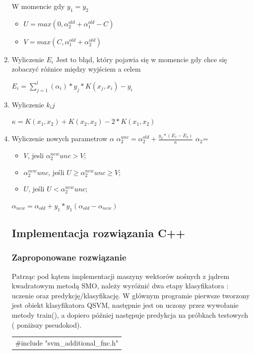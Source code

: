 \documentclass[[10pt,a4paper]{article}
\begin{document}
\begin{enumerate}
 
W momencie gdy $y_{1}=y_{2}$
\begin{itemize}
\item$ U = max(0,\alpha_{2}^{old} + \alpha_{1}^{old} - C)$
 \item $ V = max(C, \alpha_{1}^{old} + \alpha_{2}^{old})$
 
\end{itemize}
\item Wyliczenie $E_i$ Jest to błąd, który pojawia się w momencie gdy chce się zobaczyć różnice między wyjściem a celem

$ E_i = \sum_{j=1}^{l}(\alpha_{i})*y_{j}*K(x_j,x_i)-y_i$

\item Wyliczenie $k_ij$

$\kappa = K(x_1,x_2) + K(x_2,x_2) - 2*K(x_1,x_2)$

\item Wyliczenie nowych parametrow $\alpha$ \newline
$\alpha_{2}^{unc} = \alpha_{2}^{old} + \frac{y_2*(E_1-E_2)}{\kappa}$
\newline
$\alpha_{2}$= 
\begin{itemize}
\item $V$, jesli $\alpha_{2}^{new}{unc}>V$;
\item $\alpha_{2}^{new}{unc}$, jeśli $U\ge\alpha_{2}^{new}{unc}\ge V$;
\item $U$, jeśli $U<\alpha_{2}^{new}{unc}$;
\newline
\end{itemize}
$\alpha_{new} = \alpha_{old} + y_{1}*y_{1}(\alpha_{old}-\alpha_{new})$
\newpage
\subsection{Implementacja rozwiązania C++}
\subsubsection{Zaproponowane rozwiązanie}
Patrząc pod kątem implementacji maszyny wektorów nośnych z jądrem kwadratowym metodą SMO, należy wyróżnić dwa etapy klasyfikatora : uczenie oraz predykcję/klasyfikację. W głównym programie pierwsze tworzony jest obiekt klasyfikatora QSVM, następnie jest on uczony przez wywołanie metody train(), a dopiero później następuje predykcja na próbkach testowych ( poniższy pseudokod).\\ 

\begin{tabular}{|p{11.5cm}|} \hline\noindent \#include "svm\_additional\_fnc.h"


\end{tabular}
\end{enumerate}
\end{document}
